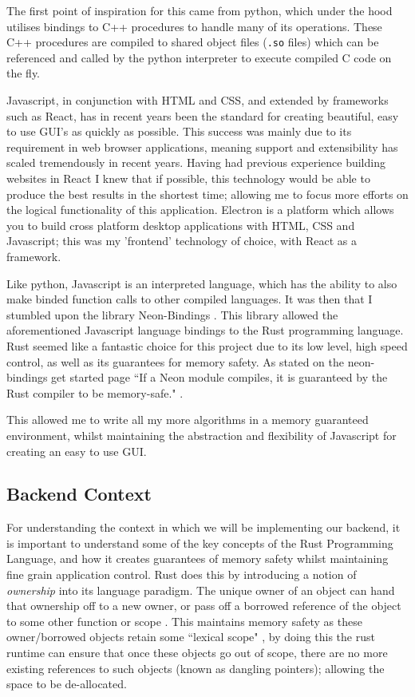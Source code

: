 \documentclass[a4paper,11pt]{article}
\newcommand{\code}[1]{\colorbox{codegray}{\texttt{#1}}}
\begin{document}
The first point of inspiration for this came from python, which under the hood utilises bindings to C++ procedures to handle many of its operations. These C++ procedures are compiled to shared object files (\code{.so} files) which can be referenced and called by the python interpreter to execute compiled C code on the fly.

Javascript, in conjunction with HTML and CSS, and extended by frameworks such as React, has in recent years been the standard for creating beautiful, easy to use GUI's as quickly as possible. This success was mainly due to its requirement in web browser applications, meaning support and extensibility has scaled tremendously in recent years. Having had previous experience building websites in React I knew that if possible, this technology would be able to produce the best results in the shortest time; allowing me to focus more efforts on the logical functionality of this application. Electron \citep{electron} is a platform which allows you to build cross platform desktop applications with HTML, CSS and Javascript; this was my 'frontend' technology of choice, with React as a framework.

Like python, Javascript is an interpreted language, which has the ability to also make binded function calls to other compiled languages. It was then that I stumbled upon the library Neon-Bindings \citep{neon}. This library allowed the aforementioned Javascript language bindings to the Rust programming language. Rust seemed like a fantastic choice for this project due to its low level, high speed control, as well as its guarantees for memory safety. As stated on the neon-bindings get started page ``If a Neon module compiles, it is guaranteed by the Rust compiler to be memory-safe." \citep{neon}. 

This allowed me to write all my more algorithms in a memory guaranteed environment, whilst maintaining the abstraction and flexibility of Javascript for creating an easy to use GUI.

\subsection{Backend Context}
For understanding the context in which we will be implementing our backend, it is important to understand some of the key concepts of the Rust Programming Language, and how it creates guarantees of memory safety whilst maintaining fine grain application control. Rust does this by introducing a notion of \textit{ownership} into its language paradigm. The unique owner of an object can hand that ownership off to a new owner, or pass off a borrowed reference of the object to some other function or scope \citep{rustProgrammingLanguage}. This maintains memory safety as these owner/borrowed objects retain some ``lexical scope" \citep{rustProgrammingLanguage}, by doing this the rust runtime can ensure that once these objects go out of scope, there are no more existing references to such objects (known as dangling pointers); allowing the space to be de-allocated.
\end{document}
